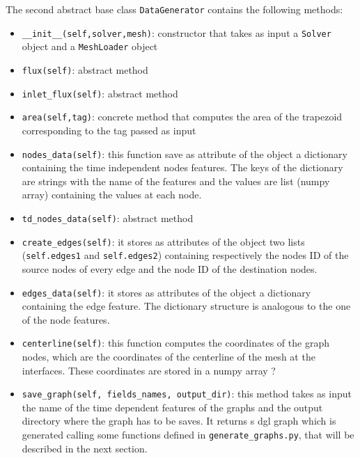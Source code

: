 \documentclass[11pt,a4paper]{article}
\begin{document}
The second abstract base class \texttt{DataGenerator} contains the following methods:
\begin{itemize}
    \item \texttt{\_\_init\_\_(self,solver,mesh)}: constructor that takes as input a \texttt{Solver} object and a \texttt{MeshLoader} object
    \item \texttt{flux(self)}: abstract method 
    \item \texttt{inlet\_flux(self)}: abstract method
    \item \texttt{area(self,tag)}: concrete method that computes the area of the trapezoid corresponding to the tag passed as input 
    \item \texttt{nodes\_data(self)}: this function save as attribute of the object
    a dictionary containing the time independent nodes features. The keys of the dictionary
    are strings with the name of the features and the values are list (numpy array) containing 
    the values at each node.
    \item \texttt{td\_nodes\_data(self)}: abstract method
    \item \texttt{create\_edges(self)}: it stores as attributes of the object two lists (\texttt{self.edges1} and \texttt{self.edges2}) containing respectively the nodes ID of the source nodes of every edge and the node ID of the destination nodes.
    \item \texttt{edges\_data(self)}: it stores as attributes of the object a dictionary    containing the edge feature. The dictionary structure is analogous to the one of the node features.
    \item \texttt{centerline(self)}: this function computes the coordinates of the graph nodes, which are the coordinates of the centerline of the mesh at the interfaces. These coordinates are stored in a numpy array ?  
    \item \texttt{save\_graph(self, fields\_names, output\_dir)}: this method takes as input the name of the time dependent features of the graphs and the output directory where the graph has to be saves. It returns s dgl graph which is generated calling some functions defined in \texttt{generate\_graphs.py}, that will be described in the next section. 
\end{itemize}
\end{document}
